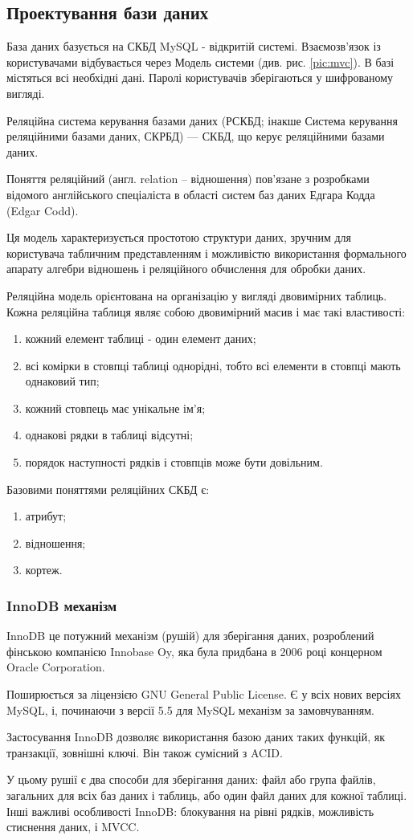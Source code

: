 \subsection{Проектування бази даних}
База даних базується на СКБД MySQL - відкритій системі. Взаємозв'язок із користувачами відбувається через Модель системи (див. рис. \ref{pic:mvc}). В базі містяться всі необхідні дані. Паролі користувачів зберігаються у шифрованому вигляді.
\par Реляційна система керування базами даних (РСКБД; інакше Система керування реляційними базами даних, СКРБД) — СКБД, що керує реляційними базами даних.
\par Поняття реляційний (англ. relation -- відношення) пов'язане з розробками відомого англійського спеціаліста в області систем баз даних Едгара Кодда (Edgar Codd).
\par Ця модель характеризується простотою структури даних, зручним для користувача табличним представленням і можливістю використання формального апарату алгебри відношень і реляційного обчислення для обробки даних.
\par Реляційна модель орієнтована на організацію у вигляді двовимірних таблиць. Кожна реляційна таблиця являє собою двовимірний масив і має такі властивості:
\begin{enumerate}
	\item кожний елемент таблиці - один елемент даних;
	\item всі комірки в стовпці таблиці однорідні, тобто всі елементи в стовпці мають однаковий тип;
	\item кожний стовпець має унікальне ім'я;
	\item однакові рядки в таблиці відсутні;
	\item порядок наступності рядків і стовпців може бути довільним.
\end{enumerate}
Базовими поняттями реляційних СКБД є:
\begin{enumerate}
	\item атрибут;
	\item відношення;
	\item кортеж.
\end{enumerate}

\subsubsection{InnoDB механізм}
\par InnoDB це потужний механізм (рушій) для зберігання даних, розроблений фінською компанією Innobase Oy, яка була придбана в 2006 році концерном Oracle Corporation.
\par Поширюється за ліцензією GNU General Public License. Є у всіх нових версіях MySQL, і, починаючи з версії 5.5 для MySQL механізм за замовчуванням.
\par Застосування InnoDB дозволяє використання базою даних таких функцій, як транзакції, зовнішні ключі. Він також сумісний з ACID.
\par У цьому рушії є два способи для зберігання даних: файл або група файлів, загальних для всіх баз даних і таблиць, або один файл даних для кожної таблиці. Інші важливі особливості InnoDB: блокування на рівні рядків, можливість стиснення даних, і MVCC.

